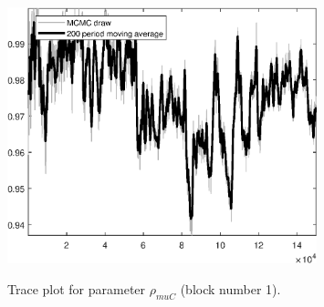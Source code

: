 \begin{figure}[H]
\centering
  \includegraphics[width=0.8\textwidth]{BRS_sectoral_wo_gmf/graphs/TracePlot_rho_muC_blck_1}\\
    \caption{Trace plot for parameter ${\rho_{muC}}$ (block number 1).}
\end{figure}
